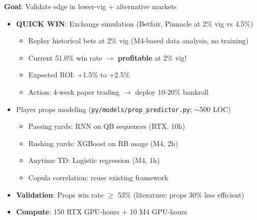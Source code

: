 \textbf{Goal}: Validate edge in lower-vig + alternative markets

\begin{itemize}
  \item {} \textbf{QUICK WIN}: Exchange simulation (Betfair, Pinnacle at 2\% vig vs 4.5\%)
  \begin{itemize}
    \item Replay historical bets at 2\% vig (M4-based data analysis, no training)
    \item Current 51.0\% win rate $\to$ \textbf{profitable} at 2\% vig!
    \item Expected ROI: +1.5\% to +2.5\%
    \item Action: 4-week paper trading $\to$ deploy 10-20\% bankroll
  \end{itemize}
  \item {} Player props modeling (\texttt{py/models/prop\_predictor.py}; $\sim$500 LOC)
  \begin{itemize}
    \item Passing yards: RNN on QB sequences (RTX, 10h)
    \item Rushing yards: XGBoost on RB usage (M4, 2h)
    \item Anytime TD: Logistic regression (M4, 1h)
    \item Copula correlation: reuse existing framework
  \end{itemize}
  \item {} \textbf{Validation}: Props win rate $\ge$ 53\% (literature: props 30\% less efficient)
  \item \textbf{Compute}: 150 RTX GPU-hours + 10 M4 GPU-hours
\end{itemize}

